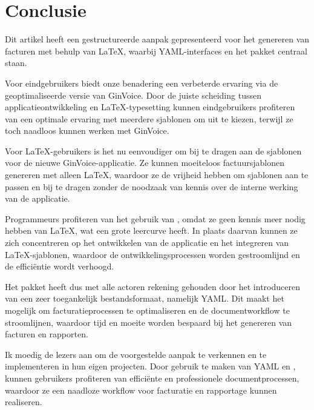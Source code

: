 \section{Conclusie}\label{sec:conclusie}
Dit artikel heeft een gestructureerde aanpak gepresenteerd voor het genereren van facturen met behulp van \LaTeX, waarbij YAML-interfaces en het  pakket centraal staan.

Voor eindgebruikers biedt onze benadering een verbeterde ervaring via de geoptimaliseerde versie van GinVoice.
Door de juiste scheiding tussen applicatieontwikkeling en \LaTeX-typesetting kunnen eindgebruikers profiteren van een optimale ervaring met meerdere sjablonen om uit te kiezen, terwijl ze toch naadloos kunnen werken met GinVoice.

Voor \LaTeX-gebruikers is het nu eenvoudiger om bij te dragen aan de sjablonen voor de nieuwe GinVoice-applicatie.
Ze kunnen moeiteloos factuursjablonen genereren met alleen \LaTeX, waardoor ze de vrijheid hebben om sjablonen aan te passen en bij te dragen zonder de noodzaak van kennis over de interne werking van de applicatie.

Programmeurs profiteren van het gebruik van , omdat ze geen kennis meer nodig hebben van \LaTeX, wat een grote leercurve heeft.
In plaats daarvan kunnen ze zich concentreren op het ontwikkelen van de applicatie en het integreren van \LaTeX-sjablonen, waardoor de ontwikkelingsprocessen worden gestroomlijnd en de efficiëntie wordt verhoogd.

Het pakket  heeft dus met alle actoren rekening gehouden door het introduceren van een zeer toegankelijk bestandsformaat, namelijk YAML\@.
Dit maakt het mogelijk om facturatieprocessen te optimaliseren en de documentworkflow te stroomlijnen, waardoor tijd en moeite worden bespaard bij het genereren van facturen en rapporten.

Ik moedig de lezers aan om de voorgestelde aanpak te verkennen en te implementeren in hun eigen projecten.
Door gebruik te maken van YAML en , kunnen gebruikers profiteren van efficiënte en professionele documentprocessen, waardoor ze een naadloze workflow voor facturatie en rapportage kunnen realiseren.
